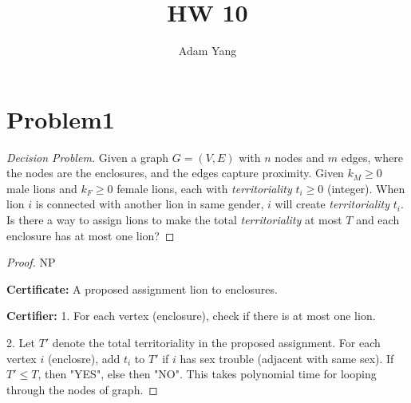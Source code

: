 \documentclass[openany]{article}
\begin{document}
\title{HW 10}
\author{Adam Yang}
\maketitle




\section*{Problem1}

\begin{proof}[Decision Problem]
    \renewcommand{\qedsymbol}{}
    
    Given a graph $G=(V,E)$ with $n$ nodes and $m$ edges, where the nodes are the enclosures, and the edges capture proximity. Given $k_M \geqslant 0$ male lions and $k_F\geqslant 0$ female lions, each with \textit{territoriality} $t_i \geqslant 0$ (integer). When lion $i$ is connected with another lion in same gender, $i$ will create \textit{territoriality} $t_i$. Is there a way to assign lions to make the total \textit{territoriality} at most $T$ and each enclosure has at most one lion?
    
\end{proof}

\begin{proof}{NP}

\textbf{Certificate:} A proposed assignment lion to enclosures.

\textbf{Certifier:} 
1. For each vertex (enclosure), check if there is at most one lion.

2. Let $T'$ denote the total territoriality in the proposed assignment. For each vertex $i$ (enclosre), add $t_i$ to $T'$ if $i$ has sex trouble (adjacent with same sex). If $T' \leqslant T$, then "YES", else then "NO". This takes polynomial time for looping through the nodes of graph. 
\end{proof}
\end{document}
